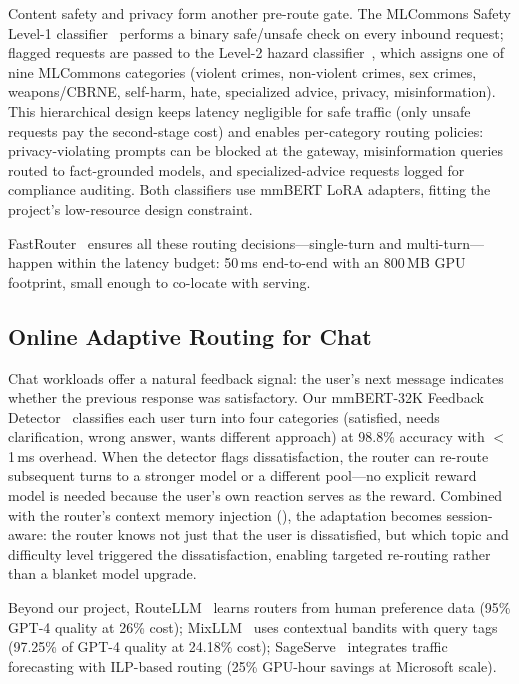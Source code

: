 Content safety and privacy form another pre-route gate.  The
MLCommons Safety Level-1 classifier~\cite{safetyl1_2026} performs a
binary safe/unsafe check on every inbound request; flagged requests
are passed to the Level-2 hazard classifier~\cite{safetyl2_2026},
which assigns one of nine MLCommons categories (violent crimes,
non-violent crimes, sex crimes, weapons/CBRNE, self-harm, hate,
specialized advice, privacy, misinformation).  This hierarchical
design keeps latency negligible for safe traffic (only unsafe
requests pay the second-stage cost) and enables per-category routing
policies: privacy-violating prompts can be blocked at the gateway,
misinformation queries routed to fact-grounded models, and
specialized-advice requests logged for compliance auditing.  Both
classifiers use mmBERT LoRA adapters, fitting the project's
low-resource design constraint.

FastRouter~\cite{fastrouter2026} ensures all these routing
decisions---single-turn and multi-turn---happen within the latency
budget: 50\,ms end-to-end with an 800\,MB GPU footprint, small
enough to co-locate with serving.


\subsection{Online Adaptive Routing for Chat}
\label{sec:router:online}

Chat workloads offer a natural feedback signal: the user's next message indicates whether the previous response was
satisfactory.  Our
mmBERT-32K Feedback Detector~\cite{feedbackdet2026} classifies each
user turn into four categories (satisfied, needs clarification, wrong
answer, wants different approach) at 98.8\% accuracy with
$<$1\,ms overhead.  When the detector flags dissatisfaction, the
router can re-route subsequent turns to a stronger model or a
different pool---no explicit reward model is needed because the
user's own reaction serves as the reward.  Combined with the
router's context memory injection (), the
adaptation becomes session-aware: the router knows not just that the
user is dissatisfied, but which topic and difficulty level triggered
the dissatisfaction, enabling targeted re-routing rather than a
blanket model upgrade.

Beyond our project, RouteLLM~\cite{ong2025routellm} learns routers
from human preference data (95\% GPT-4 quality at 26\% cost);
MixLLM~\cite{lu2025mixllm} uses contextual bandits with query tags
(97.25\% of GPT-4 quality at 24.18\% cost);
SageServe~\cite{jia2025sageserve} integrates traffic forecasting
with ILP-based routing (25\% GPU-hour savings at Microsoft scale).


